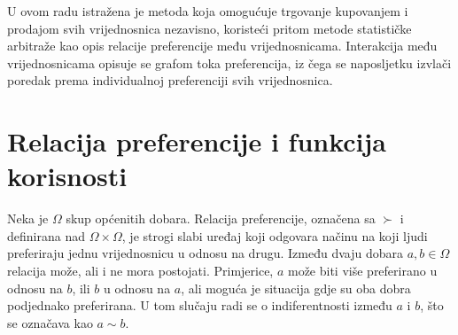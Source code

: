 \documentclass[lmodern, utf8, diplomski, numeric]{fer}
\begin{document}
  U ovom radu istražena je metoda koja omogućuje trgovanje kupovanjem i prodajom svih vrijednosnica nezavisno, koristeći pritom metode statističke arbitraže kao opis relacije preferencije među vrijednosnicama.
  Interakcija među vrijednosnicama opisuje se grafom toka preferencija, iz čega se naposljetku izvlači poredak prema individualnoj preferenciji svih vrijednosnica.
  

  \section{Relacija preferencije i funkcija korisnosti}
  Neka je $\Omega$ skup općenitih dobara.
  Relacija preferencije, označena sa $\succ$ i definirana nad $\Omega \times \Omega$, je strogi slabi uređaj koji odgovara načinu na koji ljudi preferiraju jednu vrijednosnicu u odnosu na drugu.
  Između dvaju dobara $a, b \in \Omega$ relacija može, ali i ne mora postojati.
  Primjerice, $a$ može biti više preferirano u odnosu na $b$, ili $b$ u odnosu na $a$, ali moguća je situacija gdje su oba dobra podjednako preferirana.
  U tom slučaju radi se o indiferentnosti između $a$ i $b$, što se označava kao $a \sim b$.
\end{document}
